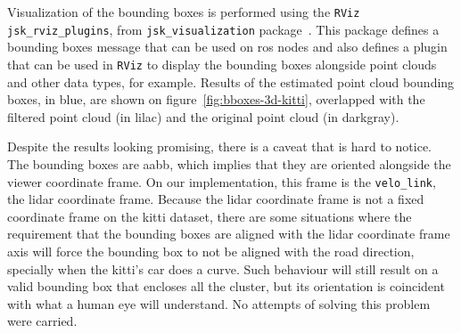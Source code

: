 Visualization of the bounding boxes is performed using the \texttt{RViz} \texttt{jsk\_rviz\_plugins}, from \texttt{jsk\_visualization} package~\cite{jsk_visualization}. This package defines a bounding boxes message that can be used on \ac{ros} nodes and also defines a plugin that can be used in \texttt{RViz} to display the bounding boxes alongside point clouds and other data types, for example. Results of the estimated point cloud bounding boxes, in blue, are shown on figure~\ref{fig:bboxes-3d-kitti}, overlapped with the filtered point cloud (in lilac) and the original point cloud (in darkgray).

Despite the results looking promising, there is a caveat that is hard to notice. The bounding boxes are \acl{aabb}, which implies that they are oriented alongside the viewer coordinate frame. On our implementation, this frame is the \texttt{velo\_link}, the \ac{lidar} coordinate frame. Because the \ac{lidar} coordinate frame is not a fixed coordinate frame on the \ac{kitti} dataset, there are some situations where the requirement that the bounding boxes are aligned with the \ac{lidar} coordinate frame axis will force the bounding box to not be aligned with the road direction, specially when the \ac{kitti}'s car does a curve. Such behaviour will still result on a valid bounding box that encloses all the cluster, but its orientation is coincident with what a human eye will understand. No attempts of solving this problem were carried. 

